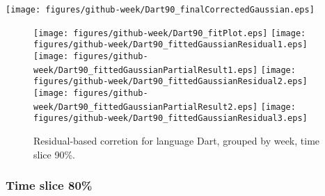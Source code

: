 \begin{center}
{\texttt{[image: figures/github-week/Dart90\_finalCorrectedGaussian.eps]}}
\end{center}

\FloatBarrier

\begin{figure}[t]
\centering
{}
{\texttt{[image: figures/github-week/Dart90\_fitPlot.eps]}}
{\texttt{[image: figures/github-week/Dart90\_fittedGaussianResidual1.eps]}}
{\texttt{[image: figures/github-week/Dart90\_fittedGaussianPartialResult1.eps]}}
{\texttt{[image: figures/github-week/Dart90\_fittedGaussianResidual2.eps]}}
{\texttt{[image: figures/github-week/Dart90\_fittedGaussianPartialResult2.eps]}}
{\texttt{[image: figures/github-week/Dart90\_fittedGaussianResidual3.eps]}}
\caption{Residual-based corretion for language Dart, grouped by week, time slice 90\%.}
\end{figure}


\FloatBarrier


\subsubsection{Time slice 80\%}

